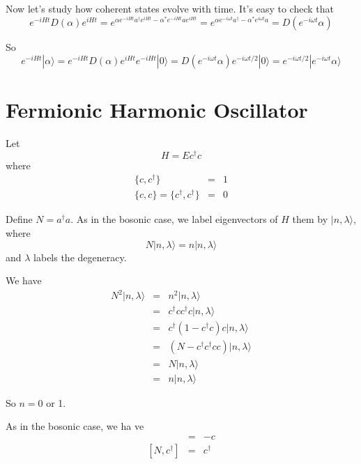 \documentclass[12pt]{book}
\begin{document}
	Now let's study how coherent states evolve with time. It's easy to check that 
	\begin{equation}
		e^{-iHt}D(\alpha)e^{iHt}=e^{\alpha e^{-iHt}a^\dagger e^{iHt}-\alpha^*e^{-iHt}ae^{iHt}}=e^{\alpha e^{-i\omega t}a^\dagger-\alpha^*e^{i\omega t}a}=D(e^{-i\omega t}\alpha)
	\end{equation}
	
	So
	\begin{equation}
		e^{-iHt}|\alpha\rangle=e^{-iHt}D(\alpha)e^{iHt}e^{-iHt}|0\rangle=D(e^{-i\omega t}\alpha)e^{-i\omega t/2}|0\rangle=e^{-i\omega t/2}|e^{-i\omega t}\alpha\rangle
	\end{equation}
	
\section{Fermionic Harmonic Oscillator}
	Let
	\begin{equation}
		H=Ec^\dagger c
	\end{equation}
	where
	\begin{eqnarray}
		\{c,c^\dagger\}&=&1\\
		\{c,c\}=\{c^\dagger,c^\dagger\}&=&0
	\end{eqnarray}
	
	Define $N=a^\dagger a$. As in the bosonic case, we label eigenvectors of $H$ them by $|n,\lambda\rangle$, where
	\begin{equation}
		N|n,\lambda\rangle=n|n,\lambda\rangle
	\end{equation}
	and $\lambda$ labels the degeneracy.
	
	We have
	\begin{eqnarray}
		N^2|n,\lambda\rangle &=& n^2|n,\lambda\rangle\\
		&=&c^\dagger cc^\dagger c|n,\lambda\rangle\\
		&=&c^\dagger (1-c^\dagger c) c|n,\lambda\rangle\\
		&=&(N-c^\dagger c^\dagger cc)|n,\lambda\rangle\\
		&=&N|n,\lambda\rangle\\
		&=&n|n,\lambda\rangle
	\end{eqnarray}
	
	So $n=0$ or 1.
	
	As in the bosonic case, we ha ve
	\begin{eqnarray}
		[N,c]&=&-c\\{}
		[N,c^\dagger]&=&c^\dagger
	\end{eqnarray}
	
\end{document}

